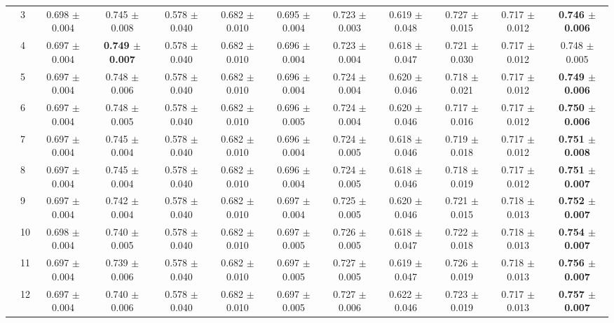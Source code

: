 \begin{table*}[t]
{\begin{tabular}{%
  ll
  @{\quad}
  c@{\hskip 4pt}c
  @{\quad\quad}
  c@{\hskip 4pt}c
  @{\quad\quad}
  c@{\hskip 4pt}c
  @{\quad\quad}
  c@{\hskip 4pt}c
  @{\quad\quad}
  c@{\hskip 4pt}c
}
        & 3 & 0.698 $\pm$ 0.004 & 0.745 $\pm$ 0.008 & 0.578 $\pm$ 0.040 & 0.682 $\pm$ 0.010 & 0.695 $\pm$ 0.004 & 0.723 $\pm$ 0.003 & 0.619 $\pm$ 0.048 & 0.727 $\pm$ 0.015 & 0.717 $\pm$ 0.012 & \textbf{0.746 $\pm$ 0.006} \\
        & 4 & 0.697 $\pm$ 0.004 & \textbf{0.749 $\pm$ 0.007} & 0.578 $\pm$ 0.040 & 0.682 $\pm$ 0.010 & 0.696 $\pm$ 0.004 & 0.723 $\pm$ 0.004 & 0.618 $\pm$ 0.047 & 0.721 $\pm$ 0.030 & 0.717 $\pm$ 0.012 & 0.748 $\pm$ 0.005 \\
        & 5 & 0.697 $\pm$ 0.004 & 0.748 $\pm$ 0.006 & 0.578 $\pm$ 0.040 & 0.682 $\pm$ 0.010 & 0.696 $\pm$ 0.004 & 0.724 $\pm$ 0.004 & 0.620 $\pm$ 0.046 & 0.718 $\pm$ 0.021 & 0.717 $\pm$ 0.012 & \textbf{0.749 $\pm$ 0.006} \\
        & 6 & 0.697 $\pm$ 0.004 & 0.748 $\pm$ 0.005 & 0.578 $\pm$ 0.040 & 0.682 $\pm$ 0.010 & 0.696 $\pm$ 0.005 & 0.724 $\pm$ 0.004 & 0.620 $\pm$ 0.046 & 0.717 $\pm$ 0.016 & 0.717 $\pm$ 0.012 & \textbf{0.750 $\pm$ 0.006} \\
        & 7 & 0.697 $\pm$ 0.004 & 0.745 $\pm$ 0.004 & 0.578 $\pm$ 0.040 & 0.682 $\pm$ 0.010 & 0.696 $\pm$ 0.004 & 0.724 $\pm$ 0.005 & 0.618 $\pm$ 0.046 & 0.719 $\pm$ 0.018 & 0.717 $\pm$ 0.012 & \textbf{0.751 $\pm$ 0.008} \\
        & 8 & 0.697 $\pm$ 0.004 & 0.745 $\pm$ 0.004 & 0.578 $\pm$ 0.040 & 0.682 $\pm$ 0.010 & 0.696 $\pm$ 0.004 & 0.724 $\pm$ 0.005 & 0.618 $\pm$ 0.046 & 0.718 $\pm$ 0.019 & 0.717 $\pm$ 0.012 & \textbf{0.751 $\pm$ 0.007} \\
        & 9 & 0.697 $\pm$ 0.004 & 0.742 $\pm$ 0.004 & 0.578 $\pm$ 0.040 & 0.682 $\pm$ 0.010 & 0.697 $\pm$ 0.004 & 0.725 $\pm$ 0.005 & 0.620 $\pm$ 0.046 & 0.721 $\pm$ 0.015 & 0.718 $\pm$ 0.013 & \textbf{0.752 $\pm$ 0.007} \\
        & 10 & 0.698 $\pm$ 0.004 & 0.740 $\pm$ 0.005 & 0.578 $\pm$ 0.040 & 0.682 $\pm$ 0.010 & 0.697 $\pm$ 0.005 & 0.726 $\pm$ 0.005 & 0.618 $\pm$ 0.047 & 0.722 $\pm$ 0.018 & 0.718 $\pm$ 0.013 & \textbf{0.754 $\pm$ 0.007} \\
        & 11 & 0.697 $\pm$ 0.004 & 0.739 $\pm$ 0.006 & 0.578 $\pm$ 0.040 & 0.682 $\pm$ 0.010 & 0.697 $\pm$ 0.005 & 0.727 $\pm$ 0.005 & 0.619 $\pm$ 0.047 & 0.726 $\pm$ 0.019 & 0.718 $\pm$ 0.013 & \textbf{0.756 $\pm$ 0.007} \\
        & 12 & 0.697 $\pm$ 0.004 & 0.740 $\pm$ 0.006 & 0.578 $\pm$ 0.040 & 0.682 $\pm$ 0.010 & 0.697 $\pm$ 0.005 & 0.727 $\pm$ 0.006 & 0.622 $\pm$ 0.046 & 0.723 $\pm$ 0.019 & 0.717 $\pm$ 0.013 & \textbf{0.757 $\pm$ 0.007} \\

\end{tabular}}
\end{table*}
